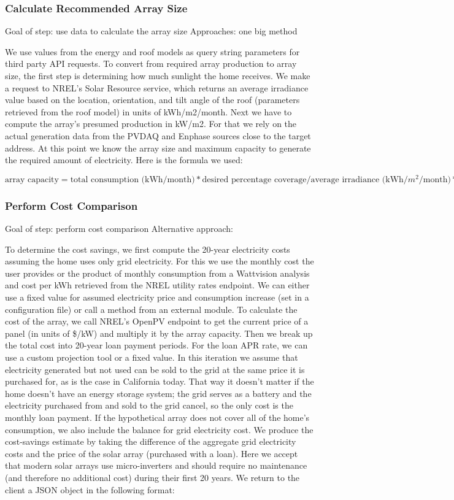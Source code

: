 \documentclass[pageno]{jpaper}
\begin{document}
\subsubsection{Calculate Recommended Array Size}
Goal of step: use data to calculate the array size
Approaches: one big method

We use values from the energy and roof models as query string parameters for third party API requests. To convert from required array production to array size, the first step is determining how much sunlight the home receives. We make a request to NREL's Solar Resource service, which returns an average irradiance value based on the location, orientation, and tilt angle of the roof (parameters retrieved from the roof model) in units of kWh/m2/month. Next we have to compute the array's presumed production in kW/m2. For that we rely on the actual generation data from the PVDAQ and Enphase sources close to the target address. At this point we know the array size and maximum capacity to generate the required amount of electricity. Here is the formula we used:

\[ \mbox{array capacity} = \mbox{total consumption (kWh/month)} * \mbox{desired percentage coverage} / \mbox{average irradiance (kWh/$m^{2}$/month)} * \mbox{average power (kW/$m^2$)} \]

\subsubsection{Perform Cost Comparison}
Goal of step: perform cost comparison
Alternative approach: 

To determine the cost savings, we first compute the 20-year electricity costs assuming the home uses only grid electricity. For this we use the monthly cost the user provides or the product of monthly consumption from a Wattvision analysis and cost per kWh retrieved from the NREL utility rates endpoint. We can either use a fixed value for assumed electricity price and consumption increase (set in a configuration file) or call a method from an external module. To calculate the cost of the array, we call NREL's OpenPV endpoint to get the current price of a panel (in units of \$/kW) and multiply it by the array capacity. Then we break up the total cost into 20-year loan payment periods. For the loan APR rate, we can use a custom projection tool or a fixed value. In this iteration we assume that electricity generated but not used can be sold to the grid at the same price it is purchased for, as is the case in California today. That way it doesn't matter if the home doesn't have an energy storage system; the grid serves as a battery and the electricity purchased from and sold to the grid cancel, so the only cost is the monthly loan payment. If the hypothetical array does not cover all of the home's consumption, we also include the balance for grid electricity cost. We produce the cost-savings estimate by taking the difference of the aggregate grid electricity costs and the price of the solar array (purchased with a loan). Here we accept that modern solar arrays use micro-inverters and should require no maintenance (and therefore no additional cost) during their first 20 years. We return to the client a JSON object in the following format:
\end{document}
